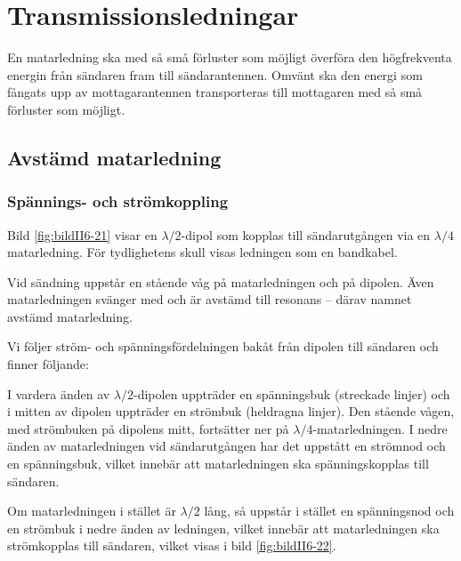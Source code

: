 \section{Transmissionsledningar}
\label{transmissionsledningar}

En matarledning ska med så små förluster som möjligt överföra den
högfrekventa energin från sändaren fram till sändarantennen.
Omvänt ska den energi som fångats upp av mottagarantennen transporteras
till mottagaren med så små förluster som möjligt.

\subsection{Avstämd matarledning}
\label{avstämd_matarledning}


\subsubsection{Spännings- och strömkoppling}

Bild \ref{fig:bildII6-21} visar en \(\lambda/2\)-dipol som kopplas till
sändarutgången via en \(\lambda/4\) matarledning.
För tydlighetens skull visas ledningen som en bandkabel.

Vid sändning uppstår en stående våg på matarledningen och på dipolen.
Även matarledningen svänger med och är avstämd till resonans
-- därav namnet avstämd matarledning.

Vi följer ström- och spänningsfördelningen bakåt från dipolen till
sändaren och finner följande:

I vardera änden av \(\lambda/2\)-dipolen uppträder en spänningsbuk (streckade
linjer) och i mitten av dipolen uppträder en strömbuk (heldragna linjer).
Den stående vågen, med strömbuken på dipolens mitt, fortsätter ner på
\(\lambda/4\)-matarledningen.
I nedre änden av matarledningen vid sändarutgången har det uppstått en strömnod
och en spänningsbuk, vilket innebär att matarledningen ska spänningskopplas
till sändaren.


Om matarledningen i stället är \(\lambda/2\) lång, så uppstår i
stället en spänningsnod och en strömbuk i nedre änden av ledningen,
vilket innebär att matarledningen ska strömkopplas till sändaren,
vilket visas i bild \ref{fig:bildII6-22}.

